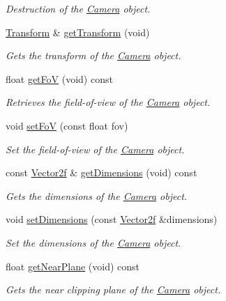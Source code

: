 \begin{DoxyCompactItemize}
\begin{DoxyCompactList}\small\item\em Destruction of the \hyperlink{classsparky_1_1_camera}{Camera} object. \end{DoxyCompactList}\item 
\hyperlink{classsparky_1_1_transform}{Transform} \& \hyperlink{classsparky_1_1_camera_a42583fd7670659f216a10d3d6b94897e}{get\+Transform} (void)
\begin{DoxyCompactList}\small\item\em Gets the transform of the \hyperlink{classsparky_1_1_camera}{Camera} object. \end{DoxyCompactList}\item 
float \hyperlink{classsparky_1_1_camera_a7521bd5105fa49440ee2254ff0701d91}{get\+FoV} (void) const 
\begin{DoxyCompactList}\small\item\em Retrieves the field-\/of-\/view of the \hyperlink{classsparky_1_1_camera}{Camera} object. \end{DoxyCompactList}\item 
void \hyperlink{classsparky_1_1_camera_a1ced308465367b54ce5ac1e7b15c18ec}{set\+FoV} (const float fov)
\begin{DoxyCompactList}\small\item\em Set the field-\/of-\/view of the \hyperlink{classsparky_1_1_camera}{Camera} object. \end{DoxyCompactList}\item 
const \hyperlink{classsparky_1_1_vector2}{Vector2f} \& \hyperlink{classsparky_1_1_camera_a9c15960bd85f509c75037c6131ce6db9}{get\+Dimensions} (void) const 
\begin{DoxyCompactList}\small\item\em Gets the dimensions of the \hyperlink{classsparky_1_1_camera}{Camera} object. \end{DoxyCompactList}\item 
void \hyperlink{classsparky_1_1_camera_a438abb899cbe330cf850bc4652e52a62}{set\+Dimensions} (const \hyperlink{classsparky_1_1_vector2}{Vector2f} \&dimensions)
\begin{DoxyCompactList}\small\item\em Set the dimensions of the \hyperlink{classsparky_1_1_camera}{Camera} object. \end{DoxyCompactList}\item 
float \hyperlink{classsparky_1_1_camera_a159d7e027cab7149195a56fbc4a71e21}{get\+Near\+Plane} (void) const 
\begin{DoxyCompactList}\small\item\em Gets the near clipping plane of the \hyperlink{classsparky_1_1_camera}{Camera} object. \end{DoxyCompactList}\item 

\end{DoxyCompactItemize}
